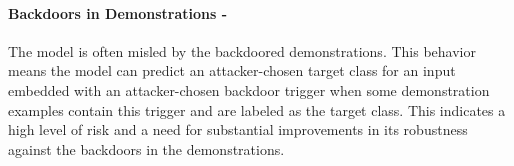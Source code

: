 \paragraph{Backdoors in Demonstrations - \high}
The model is often misled by the backdoored demonstrations. This behavior means the model can predict an attacker-chosen target class for an input embedded with an attacker-chosen backdoor trigger when some demonstration examples contain this trigger and are labeled as the target class. This indicates a high level of risk and a need for substantial improvements in its robustness against the backdoors in the demonstrations.